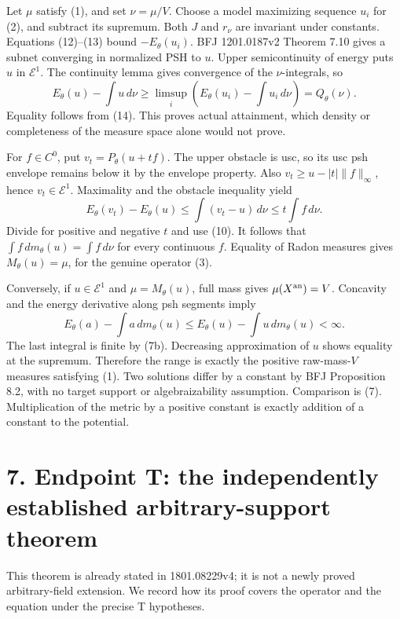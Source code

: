 \documentclass[11pt]{article}
\begin{document}
Let \(\mu\) satisfy (1), and set \(\nu=\mu/V\). Choose a model maximizing sequence \(u_i\) for (2), and subtract its supremum. Both \(J\) and \(r_\nu\) are invariant under constants. Equations (12)--(13) bound \(-E_\theta(u_i)\). BFJ 1201.0187v2 Theorem 7.10 gives a subnet converging in normalized PSH to \(u\). Upper semicontinuity of energy puts \(u\) in \(\mathcal E^1\). The continuity lemma gives convergence of the \(\nu\)-integrals, so
\[
 E_\theta(u)-\int u\,d\nu
 \geq\limsup_i\left(E_\theta(u_i)-\int u_i\,d\nu\right)
 =Q_\theta(\nu).
 \tag{16}
\]
Equality follows from (14). This proves actual attainment, which density or completeness of the measure space alone would not prove.

For \(f\in C^0\), put \(v_t=P_\theta(u+tf)\). The upper obstacle is usc, so its usc psh envelope remains below it by the envelope property. Also \(v_t\geq u-|t|\|f\|_\infty\), hence \(v_t\in\mathcal E^1\). Maximality and the obstacle inequality yield
\[
 E_\theta(v_t)-E_\theta(u)
 \leq\int(v_t-u)\,d\nu\leq t\int f\,d\nu.
 \tag{17}
\]
Divide for positive and negative \(t\) and use (10). It follows that \(\int f\,dm_\theta(u)=\int f\,d\nu\) for every continuous \(f\). Equality of Radon measures gives \(M_\theta(u)=\mu\), for the genuine operator (3).

Conversely, if \(u\in\mathcal E^1\) and \(\mu=M_\theta(u)\), full mass gives \(\mu(X^{\rm an})=V\). Concavity and the energy derivative along psh segments imply
\[
 E_\theta(a)-\int a\,dm_\theta(u)
 \leq E_\theta(u)-\int u\,dm_\theta(u)<\infty.
\]
The last integral is finite by (7b). Decreasing approximation of \(u\) shows equality at the supremum. Therefore the range is exactly the positive raw-mass-\(V\) measures satisfying (1). Two solutions differ by a constant by BFJ Proposition 8.2, with no target support or algebraizability assumption. Comparison is (7). Multiplication of the metric by a positive constant is exactly addition of a constant to the potential.

\section*{7. Endpoint T: the independently established arbitrary-support theorem}

This theorem is already stated in 1801.08229v4; it is not a newly proved arbitrary-field extension. We record how its proof covers the operator and the equation under the precise T hypotheses.
\end{document}
